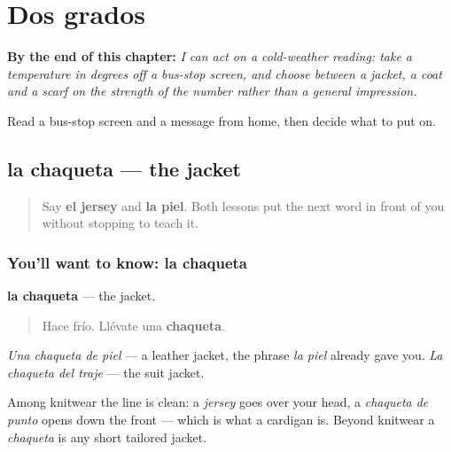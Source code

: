 
\chapter{Dos grados}
\label{ch:es-abrigo}

\begin{chapteropening}
\textbf{By the end of this chapter:} \emph{I can act on a cold-weather reading: take a temperature in degrees off a bus-stop screen, and choose between a jacket, a coat and a scarf on the strength of the number rather than a general impression.}

Read a bus-stop screen and a message from home, then decide what to put on.
\end{chapteropening}

\section[la chaqueta]{la chaqueta — the jacket}

\label{lesson:ES-C468-chaqueta}



\begin{quote}
Say \textbf{el jersey} and \textbf{la piel}. Both lessons put the next word in front of you without stopping to teach it.
\end{quote}

\subsection*{You'll want to know: la chaqueta}
\textbf{la chaqueta} — the jacket.

\begin{quote}
Hace frío. Llévate una \textbf{chaqueta}.
\end{quote}

\emph{Una chaqueta de piel} — a leather jacket, the phrase \emph{la piel} already gave you. \emph{La chaqueta del traje} — the suit jacket.

Among knitwear the line is clean: a \emph{jersey} goes over your head, a \emph{chaqueta de punto} opens down the front — which is what a cardigan is. Beyond knitwear a \emph{chaqueta} is any short tailored jacket.

